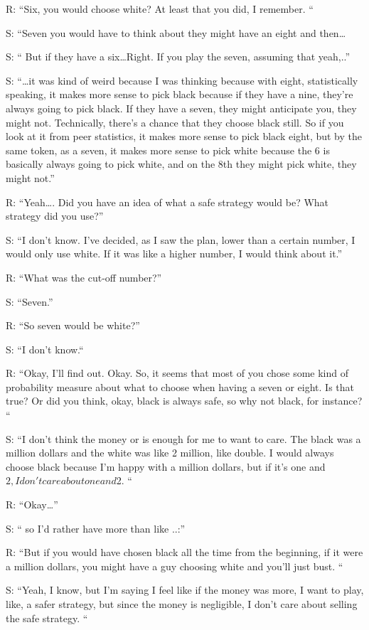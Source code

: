 \documentclass[a4paper,superscriptaddress,nofootinbib]{revtex4}
\begin{document}
R: “Six, you would choose white? At least that you did, I remember. “

S: “Seven you would have to think about they might have an eight and then…

S: “ But if they have a six…Right. If you play the seven, assuming that yeah,..”

S: “…it was kind of weird because I was thinking because with eight, statistically speaking, it makes more sense to pick black because if they have a nine, they're always going to pick black. If they have a seven, they might anticipate you, they might not. Technically, there's a chance that they choose black still. So if you look at it from peer statistics, it makes more sense to pick black eight, but by the same token, as a seven, it makes more sense to pick white because the 6 is basically always going to pick white, and on the 8th they might pick white, they might not.”

R: “Yeah…. Did you have an idea of what a safe strategy would be? What strategy did you use?”

S: “I don't know. I've decided, as I saw the plan, lower than a certain number, I would only use white. If it was like a higher number, I would think about it.”

R: “What was the cut-off number?”

S: “Seven.”

R: “So seven would be white?”

S: “I don't know.“

R: “Okay, I'll find out. Okay. So, it seems that most of you chose some kind of probability measure about what to choose when having a seven or eight. Is that true? Or did you think, okay, black is always safe, so why not black, for instance? “

S: “I don't think the money or is enough for me to want to care. The black was a million dollars and the white was like 2 million, like double. I would always choose black because I'm happy with a million dollars, but if it's one and $2, I don't care about one and $2. “

R: “Okay…”

S: “ so I'd rather have more than like ..:”

R: “But if you would have chosen black all the time from the beginning, if it were a million dollars, you might have a guy choosing white and you'll just bust. “

S: “Yeah, I know, but I'm saying I feel like if the money was more, I want to play, like, a safer strategy, but since the money is negligible, I don't care about selling the safe strategy. “ %
\end{document}
